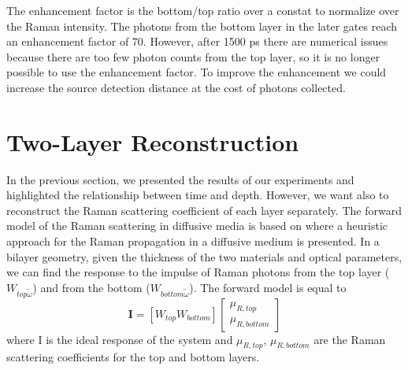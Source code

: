\documentclass{osa-article}
\begin{document}
The enhancement factor is the bottom/top ratio over a constat to normalize over the Raman intensity.
The photons from the bottom layer in the later gates reach an enhancement factor of 70. However, after 1500 ps there are numerical issues because there are too few photon counts from the top layer, so it is no longer possible to use the enhancement factor.
To improve the enhancement we could increase the source detection distance at the cost of photons collected.



\section{Two-Layer Reconstruction}
In the previous section, we presented the results of our experiments and highlighted the relationship between time and depth. However, we want also to reconstruct the Raman scattering coefficient of each layer separately.
The forward model of the Raman scattering in diffusive media is based on \cite{Martelli2016} where a heuristic approach for the Raman propagation in a diffusive medium is presented. In a bilayer geometry, given the thickness of the two materials and optical parameters, we can find the response to the impulse of Raman photons from the top layer ($W_{top\tilde{\omega}}$) and from the bottom ($W_{bottom\tilde{\omega}}$).
The forward model is equal to 
\begin{equation}
\textbf{I} = [W_{top}  W_{bottom}] \begin{bmatrix}
                                \mu_{R,top}\\
                                \mu_{R,bottom}
                            \end{bmatrix}
\end{equation}
where I is the ideal response of the system and $\mu_{R,top}$, $\mu_{R,bottom}$ are the Raman scattering coefficients for the top and bottom layers.
\end{document}
